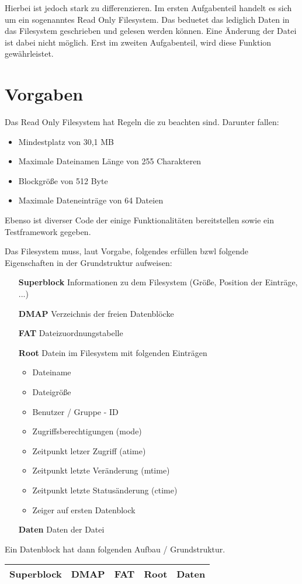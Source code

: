 Hierbei ist jedoch stark zu differenzieren. Im ersten Aufgabenteil handelt es sich um ein sogenanntes Read Only Filesystem. Das beduetet das lediglich Daten in das Filesystem geschrieben und gelesen werden können. Eine Änderung der Datei ist dabei nicht möglich. Erst im zweiten Aufgabenteil, wird diese Funktion gewährleistet.

\newpage

\section{Vorgaben}
Das Read Only Filesystem hat Regeln die zu beachten sind. Darunter fallen: 
\begin{itemize}
	\item Mindestplatz von 30,1 MB
	\item Maximale Dateinamen Länge von 255 Charakteren
	\item Blockgröße von 512 Byte
	\item Maximale Dateneinträge von 64 Dateien
\end{itemize}
Ebenso ist diverser Code der einige Funktionalitäten bereitstellen sowie ein Testframework gegeben. 

Das Filesystem muss, laut Vorgabe, folgendes erfüllen bzwl folgende Eigenschaften in der Grundstruktur aufweisen:
\begin{itemize}
	\item[\textbf{Superblock}] Informationen zu dem Filesystem (Größe, Position der Einträge, ...)
	\item[\textbf{DMAP}] Verzeichnis der freien Datenblöcke
	\item[\textbf{FAT}] Dateizuordnungstabelle
	\item[\textbf{Root}] Datein im Filesystem mit folgenden Einträgen
	\begin{itemize}
		\item Dateiname
		\item Dateigröße
		\item Benutzer / Gruppe - ID
		\item Zugriffsberechtigungen (mode)
		\item Zeitpunkt letzer Zugriff (atime)
		\item Zeitpunkt letzte Veränderung (mtime)
		\item Zeitpunkt letzte Statusänderung (ctime)
		\item Zeiger auf ersten Datenblock
	\end{itemize}
	\item[\textbf{Daten}] Daten der Datei
\end{itemize} 

Ein Datenblock hat dann folgenden Aufbau / Grundstruktur.

\begin{tabularx}{17cm}{|X|X|X|X|X|}
	\hline
	Superblock & DMAP & FAT & Root & Daten \\
	\hline
\end{tabularx}

\newpage
